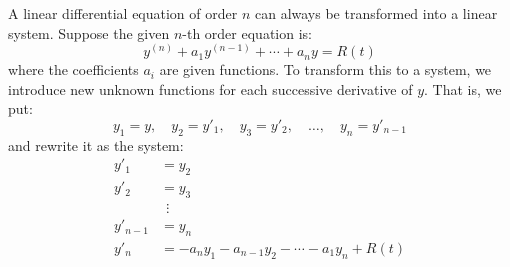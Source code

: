 \documentclass[12pt,a4paper]{report}
\theoremstyle{definition}
\numberwithin{equation}{chapter}
\begin{document}
A linear differential equation of order $n$ can always be transformed into a linear system. Suppose the given $n$-th order equation is:
\begin{equation}
y^{(n)} + a_1y^{(n-1)} + \cdots + a_n y = R(t)
\end{equation}
where the coefficients $a_i$ are given functions. To transform this to a system, we introduce new unknown functions for each successive derivative of $y$. That is, we put:
\begin{equation}
y_1 = y, \quad y_2 = y'_1, \quad y_3 = y'_2, \quad \dots, \quad y_n = y'_{n-1}
\end{equation}
and rewrite it as the system:
\begin{equation}
\begin{aligned}
y'_1 &= y_2 \\
y'_2 &= y_3 \\
     &\ \ \vdots \\
y'_{n-1} &= y_n \\
y'_n &= -a_n y_1 - a_{n-1} y_2 - \cdots - a_1 y_n + R(t)
\end{aligned}
\end{equation}
\end{document}
